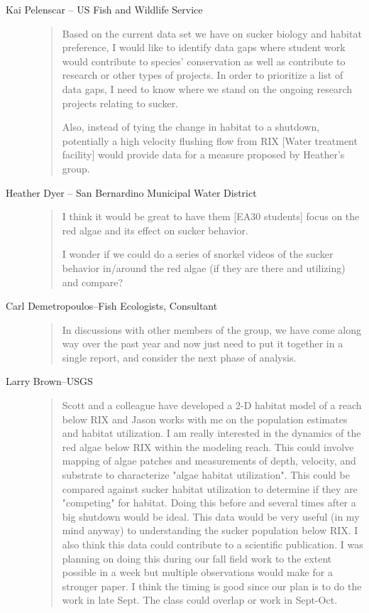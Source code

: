 \documentclass{tufte-handout}\usepackage[]{graphicx}\usepackage[]{color}
\begin{document}
\begin{description}
  \item[Kai Pelenscar -- US Fish and Wildlife Service]
  
  \begin{quote}
Based on the current data set we have on sucker biology and habitat preference, I would like to identify data gaps where student work would contribute to species' conservation as well as contribute to research or other types of projects. In order to prioritize a list of data gaps, I need to know where we stand on the ongoing research projects relating to sucker.

Also, instead of tying the change in habitat to a shutdown, potentially a high velocity flushing flow from RIX [Water treatment facility] would provide data for a measure proposed by Heather's group. 
\end{quote}

\item[Heather Dyer -- San Bernardino Municipal Water District]

\begin{quote}
I think it would be great to have them [EA30 students] focus on the red algae and its effect on sucker behavior.  

I wonder if we could do a series of snorkel videos of the sucker behavior in/around the red algae (if they are there and utilizing) and compare?

\end{quote}

\item[Carl Demetropoulos--Fish Ecologists, Consultant]

\begin{quote}
In discussions with other members of the group, we have come along way over the past year and now just need to put it together in a single report, and consider the next phase of analysis.  
\end{quote}

\item[Larry Brown--USGS]

\begin{quote}
Scott and a colleague have developed a 2-D habitat model of a reach below RIX and Jason works with me on the population estimates and habitat utilization. I am really interested in the dynamics of the red algae below RIX within the modeling reach. This could involve mapping of algae patches and measurements of depth, velocity, and substrate to characterize "algae habitat utilization". This could be compared against sucker habitat utilization to determine if they are "competing" for habitat. Doing this before and several times after a big shutdown would be ideal. This data would be very useful (in my mind anyway) to understanding the sucker population below RIX. I also think this data could contribute to a scientific publication. I was planning on doing this during our fall field work to the extent possible in a week but multiple observations would make for a stronger paper. I think the timing is good since our plan is to do the work in late Sept. The class could overlap or work in Sept-Oct.
\end{quote}


\end{description}
\end{document}
